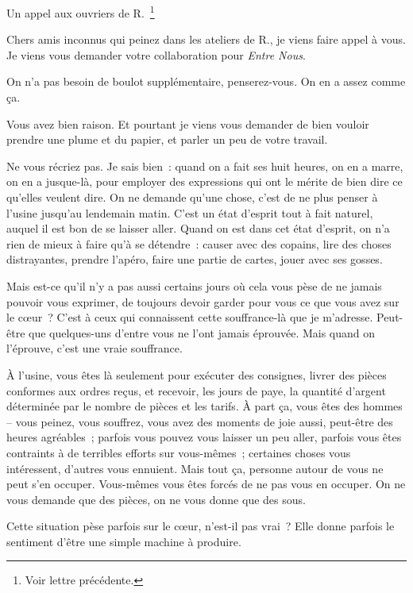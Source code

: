 \documentclass[french,twoside]{book} %
\begin{document}
\begin{center}
Un appel aux ouvriers de R. \footnote{Voir lettre précédente.}\end{center}
\noindent Chers amis inconnus qui peinez dans les ateliers de R., je viens faire appel à vous. Je viens vous demander votre collaboration pour {\itshape Entre Nous}.\par
On n'a pas besoin de boulot supplémentaire, penserez-vous. On en a assez comme ça.\par
Vous avez bien raison. Et pourtant je viens vous demander de bien vouloir prendre une plume et du papier, et parler un peu de votre travail.\par
Ne vous récriez pas. Je sais bien : quand on a fait ses huit heures, on en a marre, on en a jusque-là, pour employer des expressions qui ont le mérite de bien dire ce qu'elles veulent dire. On ne demande qu'une chose, c'est de ne plus penser à l'usine jusqu'au lendemain matin. C'est un état d'esprit tout à fait naturel, auquel il est bon de se laisser aller. Quand on est dans cet état d'esprit, on n'a rien de mieux à faire qu'à se détendre : causer avec des copains, lire des choses distrayantes, prendre l'apéro, faire une partie de cartes, jouer avec ses gosses.\par
Mais est-ce qu'il n'y a pas aussi certains jours où cela vous pèse de ne jamais pouvoir vous exprimer, de toujours devoir garder pour vous ce que vous avez sur le cœur ? C'est à ceux qui connaissent cette souffrance-là que je m'adresse. Peut-être que quelques-uns d'entre vous ne l'ont jamais éprouvée. Mais quand on l'éprouve, c'est une vraie souffrance.\par
À l'usine, vous êtes là seulement pour exécuter des consignes, livrer des pièces conformes aux ordres reçus, et recevoir, les jours de paye, la quantité d'argent déterminée par le nombre de pièces et les tarifs. À part ça, vous êtes des hommes – vous peinez, vous souffrez, vous avez des moments de joie aussi, peut-être des heures agréables ; parfois vous pouvez vous laisser un peu aller, parfois vous êtes contraints à de terribles efforts sur vous-mêmes ; certaines choses vous intéressent, d'autres vous ennuient. Mais tout ça, personne autour de vous ne peut s'en occuper. Vous-mêmes vous êtes forcés de ne pas vous en occuper. On ne vous demande que des pièces, on ne vous donne que des sous.\par
Cette situation pèse parfois sur le cœur, n'est-il pas vrai ? Elle donne parfois le sentiment d'être une simple machine à produire.\par
\end{document}
